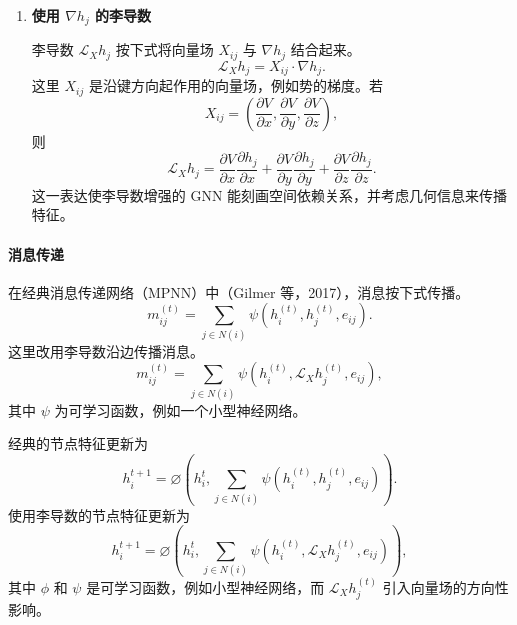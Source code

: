 \begin{enumerate}[label=\alph*.]
\begin{enumerate}[label=\arabic*.]
    利用节点 $j$ 与邻居 $k$ 之间的空间位置差近似 $\nabla h_j$，
    \[
      \nabla h_j\approx\sum_{k\in N(j)}w_{jk}(r_j-r_k),
    \]
    其中 $w_{jk}$ 为权重，例如由边特征或距离确定。
    \item \textbf{基于拉普拉斯算子的近似}

    对光滑特征 $h_j$，可用图拉普拉斯算子近似梯度，
    \[
      \nabla h_j\approx\Delta h_j=\sum_{k\in N(j)}(h_k-h_j),
    \]
    其中 $N(j)$ 表示节点 $j$ 的邻居。
    \item \textbf{依据物理定律的梯度}

    若 $h_j$ 由势能、力等物理性质得出，可由物理定律计算 $\nabla h_j$，
    \[
      \nabla h_j=-\nabla V(r_j),
    \]
    其中 $V$ 是势能函数。
  \end{enumerate}
  \item \textbf{使用 $\nabla h_j$ 的李导数}

  李导数 $\mathcal L_X h_j$ 按下式将向量场 $X_{ij}$ 与 $\nabla h_j$ 结合起来。
  \[
    \mathcal L_X h_j=X_{ij}\cdot\nabla h_j.
  \]
  这里 $X_{ij}$ 是沿键方向起作用的向量场，例如势的梯度。若
  \[
    X_{ij}=\left(\frac{\partial V}{\partial x},
                 \frac{\partial V}{\partial y},
                 \frac{\partial V}{\partial z}\right),
  \]
  则
  \[
    \mathcal L_X h_j=
      \frac{\partial V}{\partial x}\frac{\partial h_j}{\partial x}
      +\frac{\partial V}{\partial y}\frac{\partial h_j}{\partial y}
      +\frac{\partial V}{\partial z}\frac{\partial h_j}{\partial z}.
  \]
  这一表达使李导数增强的 GNN 能刻画空间依赖关系，并考虑几何信息来传播特征。
\end{enumerate}

\paragraph{消息传递}
在经典消息传递网络（MPNN）中（Gilmer 等，2017），消息按下式传播。
\[
  m_{ij}^{(t)}=\sum_{j\in N(i)}\psi(h_i^{(t)},h_j^{(t)},e_{ij}).
\]
这里改用李导数沿边传播消息。
\[
  m_{ij}^{(t)}=\sum_{j\in N(i)}\psi(h_i^{(t)},\mathcal L_X h_j^{(t)},e_{ij}),
\]
其中 $\psi$ 为可学习函数，例如一个小型神经网络。

经典的节点特征更新为
\[
  h_i^{t+1}=\varnothing\!\left(h_i^t,
       \sum_{j\in N(i)}\psi(h_i^{(t)},h_j^{(t)},e_{ij})\right).
\]
使用李导数的节点特征更新为
\[
  h_i^{t+1}=\varnothing\!\left(h_i^t,
       \sum_{j\in N(i)}\psi(h_i^{(t)},\mathcal L_X h_j^{(t)},e_{ij})\right),
\]
其中 $\phi$ 和 $\psi$ 是可学习函数，例如小型神经网络，而 $\mathcal L_X h_j^{(t)}$ 引入向量场的方向性影响。

